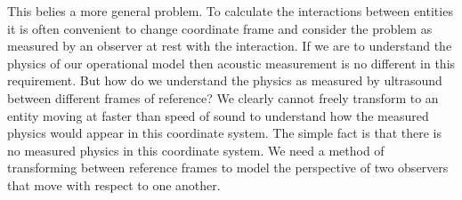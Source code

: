 This belies a more general problem.
To calculate the interactions between entities it is often convenient to change coordinate frame
and consider the problem as measured by an observer at rest with the interaction.
If we are to understand the physics of our operational model then acoustic measurement is no different in this requirement.
%
But how do we understand the physics as measured by ultrasound between different frames of reference?
We clearly cannot freely transform to an entity moving at faster than speed of sound
to understand how the measured physics would appear in this coordinate system.
The simple fact is that there is no measured physics in this coordinate system.
We need a method of transforming between reference frames to model the perspective of two
observers that move with respect to one another.














